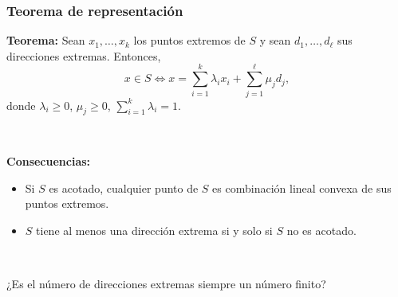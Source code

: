 \documentclass{beamer}
\begin{document}
\begin{frame}
\frametitle{Teorema de representación}

{\bf Teorema:} Sean $x_1,\ldots,x_k$ los puntos extremos de $S$ y sean $d_1,\ldots,d_\ell$ sus direcciones extremas. Entonces,
\[
x\in S \Leftrightarrow x = \sum_{i=1}^k \lambda_i x_i + \sum_{j=1}^\ell
 \mu_j d_j,
\]
donde $\lambda_i\geq 0$, $\mu_j\geq 0$, $\sum_{i=1}^k \lambda_i=1$.

\

{\bf Consecuencias:}

\begin{itemize}
\item Si $S$ es acotado, cualquier punto de $S$ es combinación lineal convexa de sus puntos extremos.


\item $S$ tiene al menos una dirección extrema si y solo si $S$ no es acotado.
\end{itemize}

\

¿Es el número de direcciones extremas siempre un número finito?
 



\end{frame}
\end{document}
